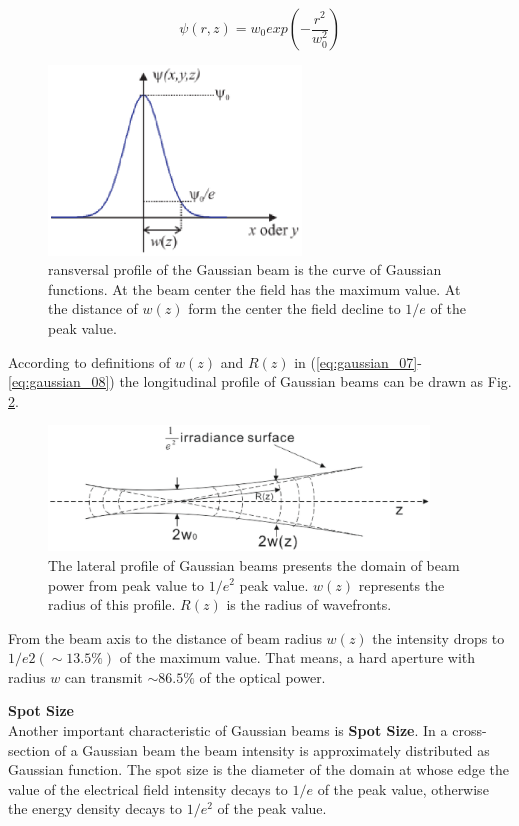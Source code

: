 \begin{equation}
\psi(r,z)=w_{0}exp\left(-\frac{r^2}{w^2_{0}}\right)
\label{eq:gaussian_09}
\end{equation}
\begin{figure}[!ht]
\centering
\includegraphics[width=0.6\textwidth]{bilder/gussian_verteilung}
\caption{ransversal profile of the Gaussian beam is the curve of Gaussian functions. At the beam center the field has the maximum value. At the distance of $w(z)$ form the center the field decline to $1/e$ of the peak value.}
\label{fig:gaussian_verteilung}
\end{figure}
According to definitions of $w(z)$ and $R(z)$ in (\ref{eq:gaussian_07}-\ref{eq:gaussian_08}) the longitudinal profile of Gaussian beams can be drawn as Fig. \ref{fig:gussian_profile}.
\begin{figure}[!ht]
\centering
\includegraphics[width=0.9\textwidth]{bilder/gussian_profile}
\caption{The lateral profile of Gaussian beams presents the domain of beam power from peak value to $1/e^2$ peak value. $w(z)$ represents the radius of this profile. $R(z)$ is the radius of wavefronts.}
\label{fig:gussian_profile}
\end{figure}
From the beam axis to the distance of beam radius $w(z)$ the intensity drops to $1/e2 (\sim13.5\%)$ of the maximum value. That means, a hard aperture with radius $w$ can transmit $\sim86.5\%$ of the optical power.

\textbf{Spot Size}\\
Another important characteristic of Gaussian beams is \textbf{Spot Size}. In a cross-section of a Gaussian beam the beam intensity is approximately distributed as Gaussian function. The spot size is the diameter of the domain at whose edge the value of the electrical field intensity decays to $1/e$ of the peak value, otherwise the energy density decays to $1/e^2$ of the peak value.
